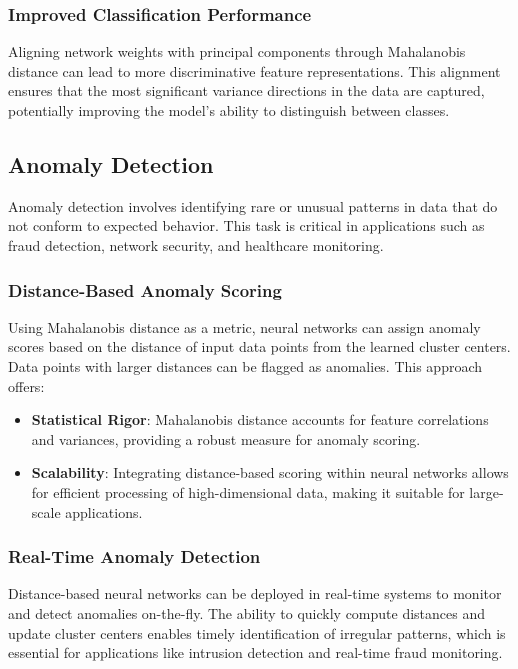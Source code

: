 \subsubsection{Improved Classification Performance}
Aligning network weights with principal components through Mahalanobis distance can lead to more discriminative feature representations. This alignment ensures that the most significant variance directions in the data are captured, potentially improving the model's ability to distinguish between classes.

\subsection{Anomaly Detection}
\label{subsec:anomaly_detection}

Anomaly detection involves identifying rare or unusual patterns in data that do not conform to expected behavior. This task is critical in applications such as fraud detection, network security, and healthcare monitoring.

\subsubsection{Distance-Based Anomaly Scoring}
Using Mahalanobis distance as a metric, neural networks can assign anomaly scores based on the distance of input data points from the learned cluster centers. Data points with larger distances can be flagged as anomalies. This approach offers:
\begin{itemize}
    \item \textbf{Statistical Rigor}: Mahalanobis distance accounts for feature correlations and variances, providing a robust measure for anomaly scoring.
    \item \textbf{Scalability}: Integrating distance-based scoring within neural networks allows for efficient processing of high-dimensional data, making it suitable for large-scale applications.
\end{itemize}

\subsubsection{Real-Time Anomaly Detection}
Distance-based neural networks can be deployed in real-time systems to monitor and detect anomalies on-the-fly. The ability to quickly compute distances and update cluster centers enables timely identification of irregular patterns, which is essential for applications like intrusion detection and real-time fraud monitoring.

